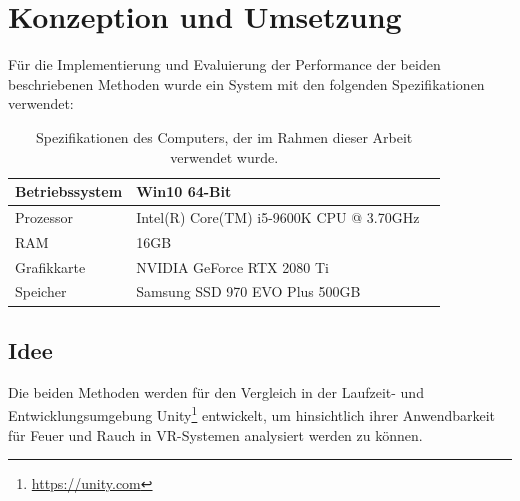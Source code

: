 \section{Konzeption und Umsetzung}
\label{sec:4}

Für die Implementierung und Evaluierung der Performance der beiden beschriebenen Methoden wurde ein System mit den folgenden Spezifikationen verwendet:

\begin{table}[h!]
	\renewcommand*{\arraystretch}{2}
	\setlength{\tabcolsep}{1.5cm}
	\begin{tabular}{lll}
		\hspace{-1.5cm}Betriebssystem & Win10 64-Bit                             \\ \hline
		\hspace{-1.5cm}Prozessor      & Intel(R) Core(TM) i5-9600K CPU @ 3.70GHz \\ \hline
		\hspace{-1.5cm}RAM            & 16GB                                     \\ \hline
		\hspace{-1.5cm}Grafikkarte    & NVIDIA GeForce RTX 2080 Ti               \\ \hline
		\hspace{-1.5cm}Speicher       & Samsung SSD 970 EVO Plus 500GB           \\ \hline
	\end{tabular}
	\caption{Spezifikationen des Computers, der im Rahmen dieser Arbeit verwendet wurde.}
\end{table}

\subsection{Idee}
\label{sec:4.1}

Die beiden Methoden werden für den Vergleich in der Laufzeit- und Entwicklungsumgebung Unity\footnote{\url{https://unity.com}} entwickelt, um hinsichtlich
ihrer Anwendbarkeit für Feuer und Rauch in VR-Systemen analysiert werden zu können.


